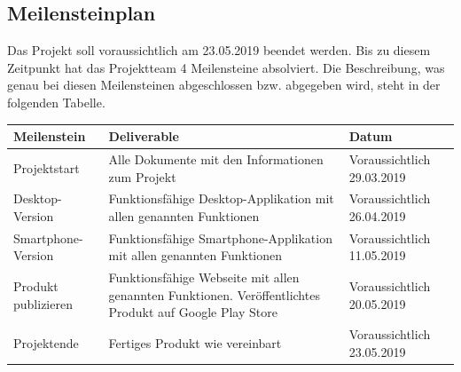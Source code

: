 \subsection{Meilensteinplan}
Das Projekt soll voraussichtlich am 23.05.2019 beendet werden. Bis zu diesem Zeitpunkt hat das Projektteam 4 Meilensteine absolviert. Die Beschreibung, was genau bei diesen Meilensteinen abgeschlossen bzw. abgegeben wird, steht in der folgenden Tabelle.
\begin{table}[H]
	\begin{center}
		\begin{tabularx}{\linewidth}{|X|X|X|}
			\hline
			\textbf{Meilenstein}&Deliverable&Datum\\
			\hline
			Projektstart&Alle Dokumente mit den Informationen zum Projekt&Voraussichtlich 29.03.2019\\
			\hline
			Desktop-Version&Funktionsfähige Desktop-Applikation mit allen genannten Funktionen&Voraussichtlich 26.04.2019\\
			\hline
			Smartphone-Version&Funktionsfähige Smartphone-Applikation mit allen genannten Funktionen&Voraussichtlich 11.05.2019\\
			\hline
			Produkt publizieren&Funktionsfähige Webseite mit allen genannten Funktionen. Veröffentlichtes Produkt auf Google Play Store&Voraussichtlich 20.05.2019\\
			\hline
			Projektende&Fertiges Produkt wie vereinbart&Voraussichtlich 23.05.2019\\
			\hline
		\end{tabularx}
	\end{center}
\end{table}